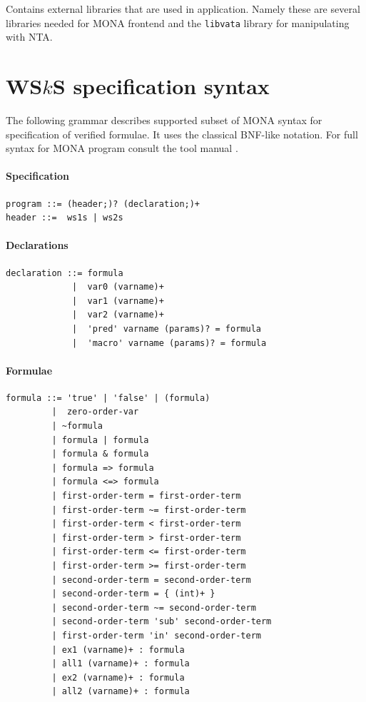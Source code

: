 Contains external libraries that are used in application. Namely these are
several libraries needed for \textsc{MONA} frontend and the \texttt{libvata}
library for manipulating with NTA.

\chapter{WS$k$S specification syntax}\label{syntax}

The following grammar describes supported subset of \textsc{MONA} syntax
for specification of verified formulae. It uses the classical BNF-like notation.
For full syntax for \textsc{MONA} program consult the tool manual \cite{monamanual}.

\subsubsection{Specification}
\begin{verbatim}
program ::= (header;)? (declaration;)+
header ::=  ws1s | ws2s
\end{verbatim}

\subsubsection{Declarations}
\begin{verbatim}
declaration ::= formula
             |  var0 (varname)+
             |  var1 (varname)+
             |  var2 (varname)+
             |  'pred' varname (params)? = formula
             |  'macro' varname (params)? = formula
\end{verbatim}

\subsubsection{Formulae}
\begin{verbatim}
formula ::= 'true' | 'false' | (formula)
         |  zero-order-var
         | ~formula
         | formula | formula
         | formula & formula
         | formula => formula
         | formula <=> formula
         | first-order-term = first-order-term 
         | first-order-term ~= first-order-term 
         | first-order-term < first-order-term 
         | first-order-term > first-order-term
         | first-order-term <= first-order-term 
         | first-order-term >= first-order-term
         | second-order-term = second-order-term
         | second-order-term = { (int)+ }
         | second-order-term ~= second-order-term
         | second-order-term 'sub' second-order-term
         | first-order-term 'in' second-order-term
         | ex1 (varname)+ : formula
         | all1 (varname)+ : formula
         | ex2 (varname)+ : formula
         | all2 (varname)+ : formula
\end{verbatim}

